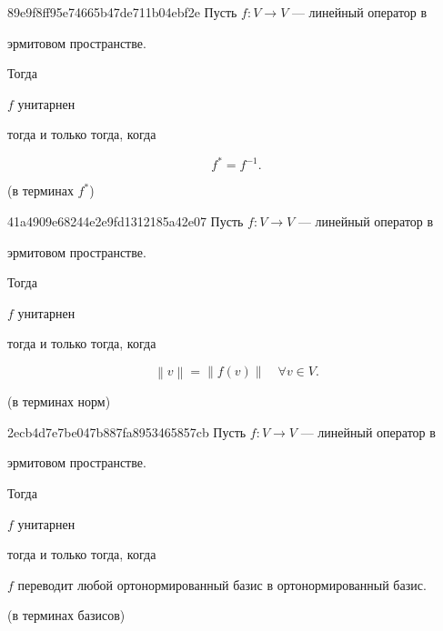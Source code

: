 \begin{note}{89e9f8ff95e74665b47de711b04ebf2e}
    Пусть \({ f : V \to V }\) --- линейный оператор в \begin{icloze}{3}эрмитовом пространстве.\end{icloze}
    Тогда \begin{icloze}{2}\({ f }\) унитарнен\end{icloze} тогда и только тогда, когда
    \begin{icloze}{1}
        \[
            f^* = f^{-1}.
        \]
    \end{icloze}

    \begin{center}
        \tiny
        (в терминах \({ f^* }\))
    \end{center}
\end{note}

\begin{note}{41a4909e68244e2e9fd1312185a42e07}
    Пусть \({ f : V \to V }\) --- линейный оператор в \begin{icloze}{3}эрмитовом пространстве.\end{icloze}
    Тогда \begin{icloze}{2}\({ f }\) унитарнен\end{icloze} тогда и только тогда, когда
    \begin{icloze}{1}
        \[
            \left\lVert v \right\rVert = \left\lVert f(v) \right\rVert \quad \forall v \in V.
        \]
    \end{icloze}

    \begin{center}
        \tiny
        (в терминах норм)
    \end{center}
\end{note}

\begin{note}{2ecb4d7e7be047b887fa8953465857cb}
    Пусть \({ f : V \to V }\) --- линейный оператор в \begin{icloze}{3}эрмитовом пространстве.\end{icloze}
    Тогда \begin{icloze}{2}\({ f }\) унитарнен\end{icloze} тогда и только тогда, когда
    \begin{icloze}{1}\({ f }\) переводит любой ортонормированный базис в ортонормированный базис.\end{icloze}

    \begin{center}
        \tiny
        (в терминах базисов)
    \end{center}
\end{note}

